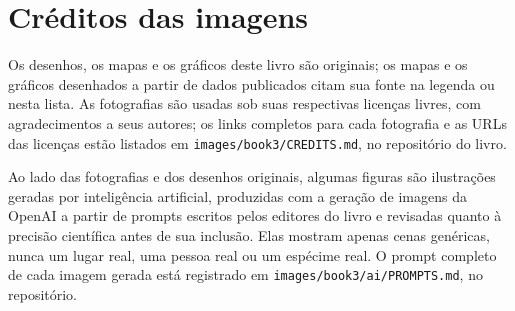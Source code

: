 \chapter*{Créditos das imagens}

Os desenhos, os mapas e os gráficos deste livro são originais; os mapas e os
gráficos desenhados a partir de dados publicados citam sua fonte na legenda ou
nesta lista. As fotografias são usadas sob suas respectivas licenças livres, com
agradecimentos a seus autores; os links completos para cada fotografia e as URLs
das licenças estão listados em \texttt{images/book3/CREDITS.md}, no repositório
do livro.

\bigskip
Ao lado das fotografias e dos desenhos originais, algumas figuras são ilustrações
geradas por inteligência artificial, produzidas com a geração de imagens da OpenAI
a partir de prompts escritos pelos editores do livro e revisadas quanto à precisão
científica antes de sua inclusão. Elas mostram apenas cenas genéricas, nunca um
lugar real, uma pessoa real ou um espécime real. O prompt completo de cada imagem
gerada está registrado em \texttt{images/book3/ai/PROMPTS.md}, no repositório.

